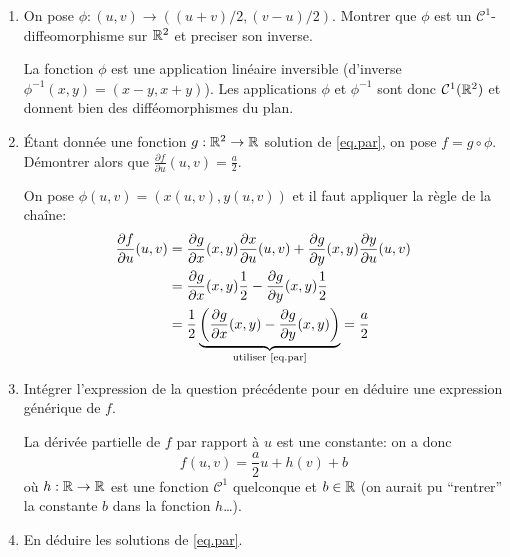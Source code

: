 \documentclass[a4paper]{tp_um}
\begin{document}
\begin{enumerate}
    \item On pose $\phi : (u,v)  \to ((u+v)/2,(v-u)/2)$. Montrer que $\phi$ est un $\mathcal C^1$-diffeomorphisme sur $\mathbb{R}^2$ et preciser son inverse. 
        
        \medskip

        La fonction $\phi$ est une application linéaire inversible (d'inverse $\phi^{-1}(x,y) = \left( x-y, x+y \right)$). Les applications $\phi$ et $\phi^{-1}$  sont donc $\mathcal C^1(\mathbb{R}^2)$ et donnent bien des difféomorphismes du plan.

        
        \medskip

    \item Étant donnée une fonction $g:\mathbb{R}^2\to\mathbb{R}$ solution de \eqref{eq.par}, on pose $f = g \circ \phi %
        $. Démontrer alors que $\frac{\partial f}{\partial u}(u,v) = \frac a 2$.
        
        \medskip
        On pose $\phi(u,v) = (x(u,v),y(u,v))$ et il faut appliquer la règle de la chaîne: 
        \begin{align*}
            \frac{\partial f}{\partial u}(u,v) &= \frac{\partial g}{\partial x}(x,y) \frac{\partial x}{\partial u} (u,v)  +\frac{\partial g}{\partial y}(x,y) \frac{\partial y}{\partial u} (u,v) \\
            & = \frac{\partial g}{\partial x}(x,y) \frac 12 -\frac{\partial g}{\partial y}(x,y)  \frac 12 \\
            & = \frac 12 \underbrace{\left( \frac{\partial g}{\partial x}(x,y) -\frac{\partial g}{\partial y}(x,y)  \right)}_{\text{utiliser \eqref{eq.par}}} = \frac a2
        \end{align*}

        \medskip

    \item Intégrer l'expression de la question précédente pour en déduire une expression générique de $f$.

        \medskip

        La dérivée partielle de $f$ par rapport à $u$ est une constante: on a donc \[f(u,v) = \frac a2 u + h(v) + b\] où $h:\mathbb{R}\to\mathbb{R}$ est une fonction $\mathcal C^1$ quelconque et $b\in \mathbb{R}$ (on aurait pu ``rentrer'' la constante $b$ dans la fonction $h$\ldots).

        \medskip

    \item En déduire les solutions de \eqref{eq.par}.


\end{enumerate}
\end{document}
